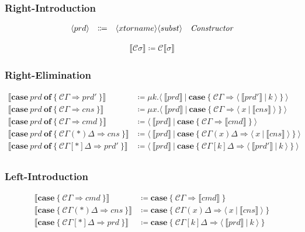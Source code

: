 \documentclass[11pt]{article}
\newcommand{\translate}[1]{\llbracket #1 \rrbracket}
\newcommand{\C}{\mathcal{C}}
\newcommand{\case}[1]{\mathbf{case}\ \{\ #1\ \}}
\newcommand{\caseof}[2]{\mathbf{case}\ #1\ \mathbf{of}\ \{\ #2\ \}}
\newcommand{\pat}[1]{\C\Gamma \Rightarrow #1 }
\newcommand{\prdpat}[2]{\C\Gamma(#1)\Delta \Rightarrow #2 }
\newcommand{\cnspat}[2]{\C\Gamma[#1]\Delta \Rightarrow #2 }
\newcommand{\nonterminal}[1]{\langle #1 \rangle}
\newcommand{\cut}[2]{\langle\ #1\ |\ #2\ \rangle}
\begin{document}
\subsubsection{Right-Introduction}

\[
  \begin{array}{lclr}
    \nonterminal{prd} & \Coloneqq & \nonterminal{xtorname}\nonterminal{subst} & \emph{Constructor} \\
  \end{array}
\]

\begin{align*}
  \translate{\C\sigma} \coloneqq \C\translate{\sigma}
\end{align*}

\subsubsection{Right-Elimination}


\begin{align*}
  \translate{\caseof{prd}{\pat{prd'}}} &\coloneqq \mu k.\cut{\translate{prd}}{\case{\pat{\cut{\translate{prd'}}{k}}}}\\
  \translate{\caseof{prd}{\pat{cns}}} &\coloneqq \mu x.\cut{\translate{prd}}{\case{\pat{\cut{x}{\translate{cns}}}}}\\
  \translate{\caseof{prd}{\pat{cmd}}} &\coloneqq \cut{\translate{prd}}{\case{\pat{\translate{cmd}}}}\\
  \translate{\caseof{prd}{\prdpat{*}{cns}}} &\coloneqq \cut{\translate{prd}}{\case{\prdpat{x}{\cut{x}{\translate{cns}}}}} \\
  \translate{\caseof{prd}{\cnspat{*}{prd'}}} &\coloneqq \cut{\translate{prd}}{\case{\cnspat{k}{\cut{\translate{prd'}}{k}}}} \\
\end{align*}

\subsubsection{Left-Introduction}

\begin{align*}
  \translate{\case{\pat{cmd}}} &\coloneqq \case{\pat{\translate{cmd}}} \\
  \translate{\case{\prdpat{*}{cns}}} &\coloneqq \case{\prdpat{x}{\cut{x}{\translate{cns}}}} \\
  \translate{\case{\cnspat{*}{prd}}} &\coloneqq \case{\cnspat{k}{\cut{\translate{prd}}{k}}} \\
\end{align*}
\end{document}
